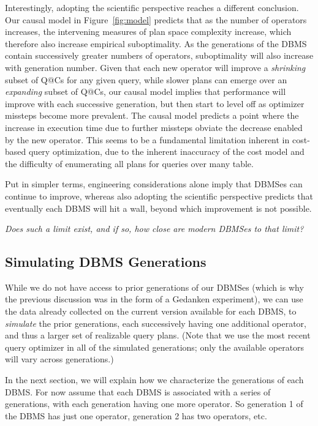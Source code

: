 \documentclass[prodmode,acmtods]{acmsmall}
\begin{document}
Interestingly, adopting the scientific perspective reaches a different conclusion. Our
causal model in Figure~\ref{fig:model} predicts that as the number of
operators increases, the intervening measures of plan space complexity increase,
which therefore also increase empirical suboptimality. As the generations of the
\hbox{DBMS} contain successively greater numbers of operators, suboptimality
will also increase with generation number.  Given that each new operator
will improve a {\em shrinking}
subset of Q@Cs for any given query, while slower plans can emerge over an
{\em expanding} subset of Q@Cs, our causal model implies that performance
will improve with each successive generation, but then
start to level off as optimizer missteps become more prevalent.
The causal model predicts a point where the
\hbox{increase} in execution time due to further missteps obviate the decrease
enabled by the new operator. This seems to be a fundamental limitation
inherent in cost-based query optimization, due to the inherent inaccuracy of
the cost model and the difficulty of enumerating all plans for queries over
many table.

Put in simpler terms, engineering considerations alone imply that DBMSes can
continue to improve, whereas also adopting the scientific perspective predicts
that eventually each DBMS will hit a wall, beyond which improvement is not possible.

\vspace{1ex}
{\em Does such a limit exist, and if so, how close are modern \hbox{DBMSes} to that limit?}

\subsection{Simulating \hbox{DBMS} Generations}
While we do not have access to prior generations of our \hbox{DBMSes} (which is why
the previous discussion was in the form of a Gedanken experiment), we can
use the data already collected on the
current version available for each \hbox{DBMS}, to {\em simulate} the prior
generations, each successively having one additional operator, and thus a
larger set of realizable query plans. (Note that we use the most recent query
optimizer in all of the simulated generations; only the available operators
will vary across generations.)

In the next section, we will explain how we characterize the generations of
each DBMS. For now assume that each DBMS is associated with a series of
generations, with each generation having one more operator. So generation 1
of the DBMS has just one operator, generation 2 has two operators, etc.
\end{document}

